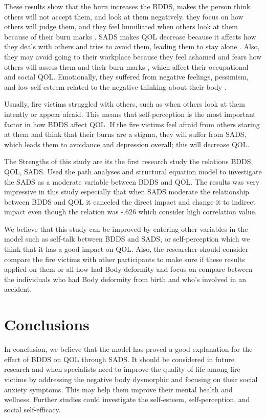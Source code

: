 \documentclass[10pt]{NSP1}
\begin{document}
	These results show that the burn increases the BDDS, makes the person think others will not accept them, and look at them negatively. they focus on how others will judge them, and they feel humiliated when others look at them because of their burn marks \cite{Suluhan2023}. SADS makes QOL decrease because it affects how they deals with others and tries to avoid them, leading them to stay alone \cite{Gorbani2021}. Also, they may avoid going to their workplace because they feel ashamed and fears how others will assess them and their burn marks \cite{Hussain2023}, which affect their occupational and social QOL. Emotionally, they suffered from negative feelings, pessimism, and low self-esteem related to the negative thinking about their body \cite{Yesilyurt2024}.
	
	Usually, fire victims struggled with others, such as when others look at them intently or appear afraid. This means that self-perception is the most important factor in how BDDS affect QOL. If the fire victims feel afraid from others staring at them and think that their burns are a stigma, they will suffer from SADS, which leads them to avoidance and depression overall; this will decrease QOL.
	
	The Strengths of this study are its the first research study the relations BDDS, QOL, SADS. Used the path analyses and structural equation model to investigate the SADS as a moderate variable between BDDS and QOL. The results was very impressive in this study especially that when SADS moderate the relationship between BDDS and QOL it canceled the direct impact and change it to indirect impact even though the relation was -.626 which consider high correlation value.
	
	We believe that this study can be improved by entering other variables in the model such as self-talk between BDDS and SADS, or self-perception which we think that it has a good impact on QOL. Also, the researcher should consider compare the fire victims with other participants to make sure if these results applied on them or all how had Body deformity and focus on compare between the individuals who had Body deformity from birth and who's involved in an accident.
	
	\section{Conclusions}
	In conclusion, we believe that the model has proved a good explanation for the effect of BDDS on QOL through SADS. It should be considered in future research and when specialists need to improve the quality of life among fire victims by addressing the negative body dysmorphic and focusing on their social anxiety symptoms. This may help them improve their mental health and wellness. Further studies could investigate the self-esteem, self-perception, and social self-efficacy.
	
\end{document}
